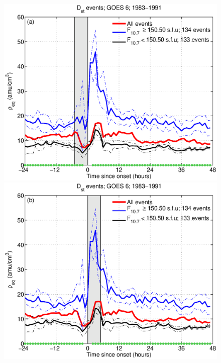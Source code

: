 \documentclass[12pt]{article}
\begin{document}
	\begin{figure}[tp!]
		\centering
		\includegraphics[scale=0.40]{2016SW001507R-p06a.eps}
		\includegraphics[scale=0.40]{2016SW001507R-p06b.eps}
	\end{figure}
	
	\clearpage
	
\end{document}
